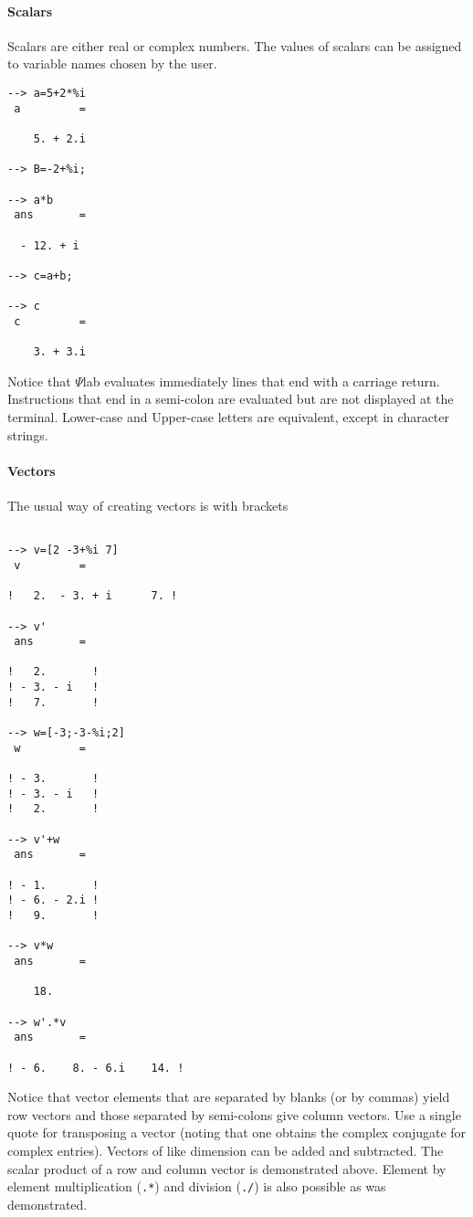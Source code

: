 \paragraph{Scalars}
Scalars are either real or complex numbers.  The values of
scalars can be assigned to variable names chosen by the user.
\begin{verbatim}
--> a=5+2*%i
 a         =
 
    5. + 2.i  
 
--> B=-2+%i;
 
--> a*b
 ans       =
 
  - 12. + i    
 
--> c=a+b;
 
--> c
 c         =
 
    3. + 3.i  
\end{verbatim}
Notice that $\Psi$lab evaluates immediately lines that
end with a carriage return.  Instructions that end in a semi-colon
are evaluated but are not displayed at the terminal. Lower-case
and Upper-case letters are equivalent, except in character strings.

\paragraph{Vectors}
The usual way of creating vectors is with brackets
\begin{verbatim}
 
--> v=[2 -3+%i 7]
 v         =
 
!   2.  - 3. + i      7. !
 
--> v'
 ans       =
 
!   2.       !
! - 3. - i   !
!   7.       !
 
--> w=[-3;-3-%i;2]
 w         =
 
! - 3.       !
! - 3. - i   !
!   2.       !
 
--> v'+w
 ans       =
 
! - 1.       !
! - 6. - 2.i !
!   9.       !
 
--> v*w
 ans       =
 
    18.  
 
--> w'.*v
 ans       =
 
! - 6.    8. - 6.i    14. !
\end{verbatim}
Notice that vector elements that are separated by blanks (or by commas)
yield row vectors and those separated by semi-colons give column vectors.
Use a single quote for transposing a vector 
(noting that 
one obtains the complex conjugate for complex entries).  Vectors of like
dimension can be added and subtracted.  The scalar product of a row and
column vector is demonstrated above.  Element by element
multiplication ({\tt .*}) and division ({\tt ./}) is also possible 
as was demonstrated.

